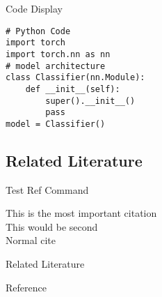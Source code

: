 \documentclass[pdf]{beamer}
\begin{document}
\begin{frame}[fragile]{Code Display}
    
    
\begin{lstlisting}[basicstyle=\normalise, style=py]
# Python Code
import torch
import torch.nn as nn
# model architecture
class Classifier(nn.Module):
    def __init__(self):
        super().__init__()
        pass
model = Classifier()
\end{lstlisting}
    
\end{frame}

\subsection{Related Literature}

\begin{frame}{Test Ref Command}






This is the most important citation ~\cite[s]{10.1257/aer.20181607}\\
This would be second ~\cite[a]{10.1257/aer.20190553}\\
Normal cite ~\cite{Adler:1998:MDL}


\end{frame}




\begin{frame}{Related Literature}
    
\end{frame}


\begin{frame}[t, allowframebreaks]{Reference}

\printbibliography
    
    
\end{frame}
\end{document}
